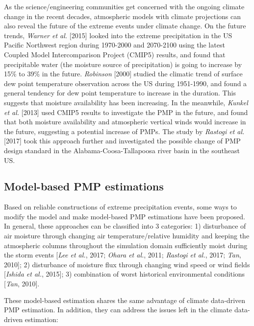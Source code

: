 As the science/engineering communities get concerned with the ongoing climate change in the recent decades, atmospheric models with climate projections can also reveal the future of the extreme events under climate change. On the future trends, \textit{Warner et al.} [2015] looked into the extreme precipitation in the US Pacific Northwest region during 1970-2000 and 2070-2100 using the latest Coupled Model Intercomparison Project (CMIP5) results, and found that precipitable water (the moisture source of precipitation) is going to increase by 15\% to 39\% in the future. \textit{Robinson} [2000] studied the climatic trend of surface dew point temperature observation across the US during 1951-1990, and found a general tendency for dew point temperature to increase in the duration. This suggests that moisture availability has been increasing. In the meanwhile, \textit{Kunkel et al.} [2013] used CMIP5 results to investigate the PMP in the future, and found that both moisture availability and atmospheric vertical winds would increase in the future, suggesting a potential increase of PMPs. The study by \textit{Rastogi et al.} [2017]  took this approach further and investigated the possible change of PMP design standard in the Alabama-Coosa-Tallapoosa river basin in the southeast US.

\subsection{Model-based PMP estimations}

Based on reliable constructions of extreme precipitation events, some ways to modify the model and make model-based PMP estimations have been proposed. In general, these approaches can be classified into 3 categories: 1) disturbance of air moisture through changing air temperature/relative humidity and keeping the atmospheric columns throughout the simulation domain sufficiently moist during the storm events [\textit{Lee et al.}, 2017; \textit{Ohara et al.}, 2011; \textit{Rastogi et al.}, 2017; \textit{Tan}, 2010]; 2) disturbance of moisture flux through changing wind speed or wind fields [\textit{Ishida et al.}, 2015]; 3) combination of worst historical environmental conditions [\textit{Tan}, 2010].

These model-based estimation shares the same advantage of climate data-driven PMP estimation. In addition, they can address the issues left in the climate data-driven estimation:

